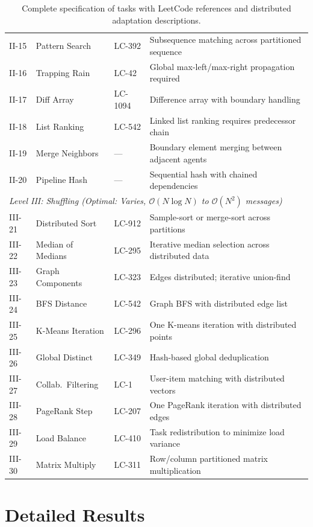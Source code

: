 \begin{table}[t]
\begin{tabular}{@{}llp{3.2cm}p{6.5cm}@{}}
II-15 & Pattern Search & LC-392 & Subsequence matching across partitioned sequence \\
II-16 & Trapping Rain & LC-42 & Global max-left/max-right propagation required \\
II-17 & Diff Array & LC-1094 & Difference array with boundary handling \\
II-18 & List Ranking & LC-542 & Linked list ranking requires predecessor chain \\
II-19 & Merge Neighbors & --- & Boundary element merging between adjacent agents \\
II-20 & Pipeline Hash & --- & Sequential hash with chained dependencies \\
\midrule
\multicolumn{4}{l}{\textit{Level III: Shuffling (Optimal: Varies, $\mathcal{O}(N \log N)$ to $\mathcal{O}(N^2)$ messages)}} \\
\midrule
III-21 & Distributed Sort & LC-912 & Sample-sort or merge-sort across partitions \\
III-22 & Median of Medians & LC-295 & Iterative median selection across distributed data \\
III-23 & Graph Components & LC-323 & Edges distributed; iterative union-find \\
III-24 & BFS Distance & LC-542 & Graph BFS with distributed edge list \\
III-25 & K-Means Iteration & LC-296 & One K-means iteration with distributed points \\
III-26 & Global Distinct & LC-349 & Hash-based global deduplication \\
III-27 & Collab.\ Filtering & LC-1 & User-item matching with distributed vectors \\
III-28 & PageRank Step & LC-207 & One PageRank iteration with distributed edges \\
III-29 & Load Balance & LC-410 & Task redistribution to minimize load variance \\
III-30 & Matrix Multiply & LC-311 & Row/column partitioned matrix multiplication \\
\bottomrule
\end{tabular}
\caption{Complete specification of \silobench{} tasks with LeetCode references and distributed adaptation descriptions.}
\label{tab:full_mapping}
\end{table}


\section{Detailed Results}
\label{app:detailed}

